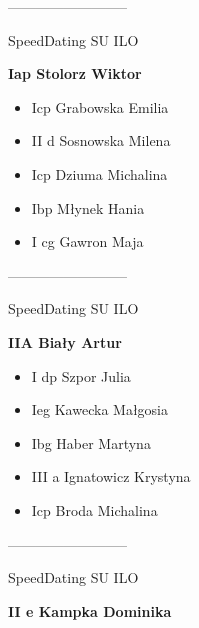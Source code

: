\documentclass[a4paper,10pt]{article}
\begin{document}
\begin{multicols}{3}
\begin{minipage}[l]{\textwidth}
\begin{itemize}
    \end{itemize}



\end{minipage}



\begin{minipage}[l]{\textwidth}
--------------------------

  \footnotesize{SpeedDating SU ILO}

  \bfseries{Iap Stolorz Wiktor}

  \begin{itemize}
    \item Icp Grabowska Emilia
    \item II d Sosnowska Milena
    \item Icp Dziuma Michalina
    \item Ibp Młynek Hania
    \item I cg Gawron Maja

    \end{itemize}



\end{minipage}



\begin{minipage}[l]{\textwidth}
--------------------------

  \footnotesize{SpeedDating SU ILO}

  \bfseries{IIA Biały Artur}

  \begin{itemize}
    \item I dp Szpor Julia
    \item Ieg Kawecka Małgosia
    \item Ibg Haber Martyna
    \item III a Ignatowicz Krystyna
    \item Icp Broda Michalina

    \end{itemize}



\end{minipage}



\begin{minipage}[l]{\textwidth}
--------------------------

  \footnotesize{SpeedDating SU ILO}

  \bfseries{II e Kampka Dominika}


\end{minipage}
\end{multicols}
\end{document}
